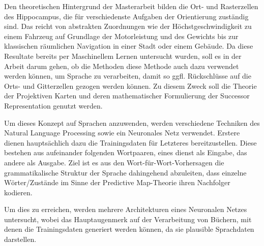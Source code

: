 \documentclass{scrarticle}
\begin{document}
Den theoretischen Hintergrund der Masterarbeit bilden die Ort- und Rasterzellen des Hippocampus, die für verschiedenste Aufgaben der Orientierung zuständig sind. Das reicht von abstrakten Zuordnungen wie der Höchstgeschwindigkeit zu einem Fahrzeug auf Grundlage der Motorleistung und des Gewichts bis zur klassischen räumlichen Navigation in einer Stadt oder einem Gebäude. Da diese Resultate bereits per Maschinellem Lernen untersucht wurden, soll es in der Arbeit darum gehen, ob die Methoden diese Methode auch dazu verwendet werden können, um Sprache zu verarbeiten, damit so ggfl. Rückschlüsse auf die Orts- und Gitterzellen gezogen werden können. Zu diesem Zweck soll die Theorie der Projektiven Karten und deren mathematischer Formulierung der Successor Representation genutzt werden.

Um dieses Konzept auf Sprachen anzuwenden, werden verschiedene Techniken des Natural Language Processing sowie ein Neuronales Netz verwendet. Erstere dienen hauptsächlich dazu die Trainingsdaten für Letzteres bereitzustellen. Diese bestehen aus aufeinander folgenden Wortpaaren, eines dienst als Eingabe, das andere als Ausgabe. Ziel ist es aus den Wort-für-Wort-Vorhersagen die grammatikalische Struktur der Sprache dahingehend abzuleiten, dass einzelne Wörter/Zustände im Sinne der Predictive Map-Theorie ihren Nachfolger kodieren.

Um dies zu erreichen, werden mehrere Architekturen eines Neuronalen Netzes untersucht, wobei das Hauptaugenmerk auf der Verarbeitung von Büchern, mit denen die Trainingsdaten generiert werden können, da sie plausible Sprachdaten darstellen.
\end{document}
